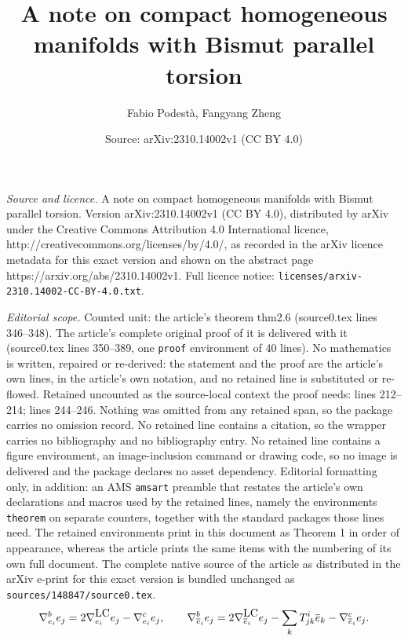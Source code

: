 \documentclass[10pt,a4paper]{amsart}
\title{A note on compact homogeneous manifolds with Bismut parallel torsion}
\author{Fabio Podest\`a, Fangyang Zheng}
\date{Source: arXiv:2310.14002v1 (CC BY 4.0)}
\begin{document}
\maketitle

\noindent\emph{Source and licence.} A note on compact homogeneous manifolds with Bismut parallel torsion. Version arXiv:2310.14002v1 (CC BY 4.0), distributed by arXiv under the Creative Commons Attribution 4.0 International licence, http://creativecommons.org/licenses/by/4.0/, as recorded in the arXiv licence metadata for this exact version and shown on the abstract page https://arxiv.org/abs/2310.14002v1. Full licence notice: \texttt{licenses/arxiv-2310.14002-CC-BY-4.0.txt}.\par\smallskip

\noindent\textit{Editorial scope.} Counted unit: the article's theorem thm2.6 (source0.tex lines 346--348). The article's complete original proof of it is delivered with it (source0.tex lines 350--389, one \texttt{proof} environment of 40 lines). No mathematics is written, repaired or re-derived: the statement and the proof are the article's own lines, in the article's own notation, and no retained line is substituted or re-flowed.  Retained uncounted as the source-local context the proof needs: lines 212--214; lines 244--246.  Nothing was omitted from any retained span, so the package carries no omission record.  No retained line contains a citation, so the wrapper carries no bibliography and no bibliography entry.  No retained line contains a figure environment, an image-inclusion command or drawing code, so no image is delivered and the package declares no asset dependency.  Editorial formatting only, in addition: an AMS \texttt{amsart} preamble that restates the article's own declarations and macros used by the retained lines, namely the environments \texttt{theorem} on separate counters, together with the standard packages those lines need.  The retained environments print in this document as Theorem 1 in order of appearance, whereas the article prints the same items with the numbering of its own full document.  The complete native source of the article as distributed in the arXiv e-print for this exact version is bundled unchanged as \texttt{sources/148847/source0.tex}.
\begin{equation}\label{Bism}
\nabla^b_{e_i}e_j = 2\nabla^{\mbox{\tiny LC}}_{e_i}e_j -\nabla^c_{e_i}e_j, \qquad  \nabla^b_{\overline e_i}e_j =2\nabla^{\mbox{\tiny LC}}_{\overline e_i}e_j -\sum_k T^i_{jk}\overline{e}_k - \nabla^c_{\overline e_i}e_j.
\end{equation}
\end{document}
